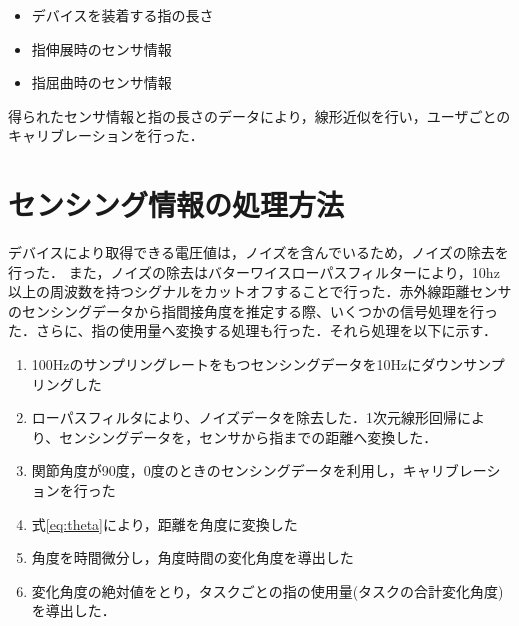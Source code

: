 \begin{itemize}
 \item デバイスを装着する指の長さ
 \item 指伸展時のセンサ情報
 \item 指屈曲時のセンサ情報
\end{itemize}

得られたセンサ情報と指の長さのデータにより，線形近似を行い，ユーザごとのキャリブレーションを行った．




\section{センシング情報の処理方法}
デバイスにより取得できる電圧値は，ノイズを含んでいるため，ノイズの除去を行った．
また，ノイズの除去はバターワイスローパスフィルターにより，10hz以上の周波数を持つシグナルをカットオフすることで行った．赤外線距離センサのセンシングデータから指間接角度を推定する際、いくつかの信号処理を行った．さらに、指の使用量へ変換する処理も行った．それら処理を以下に示す．

\begin{enumerate}
 \item 100Hzのサンプリングレートをもつセンシングデータを10Hzにダウンサンプリングした
 \item  ローパスフィルタにより、ノイズデータを除去した．1次元線形回帰により、センシングデータを，センサから指までの距離へ変換した．
 \item 関節角度が90度，0度のときのセンシングデータを利用し，キャリブレーションを行った
 \item 式\ref{eq:theta}により，距離を角度に変換した
 \item 角度を時間微分し，角度時間の変化角度を導出した
 \item 変化角度の絶対値をとり，タスクごとの指の使用量(タスクの合計変化角度)を導出した．
\end{enumerate}
